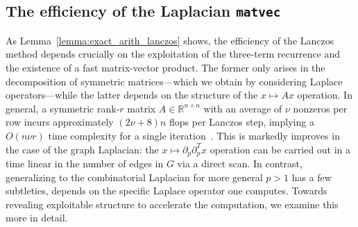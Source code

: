 \documentclass[12pt]{article}
\numberwithin{equation}{section}
\newcommand{\+}{%
	\raisebox{0.18ex}{\scaleobj{0.55}{+}}
}
\theoremstyle{definition}
\begin{document}
\subsection{The efficiency of the Laplacian \texttt{matvec}}\label{sec:comb_lap}
As Lemma~\ref{lemma:exact_arith_lanczos} shows, the efficiency of the Lanczos method depends crucially on the exploitation of the three-term recurrence and the existence of a fast matrix-vector product. 
The former only arises in the decomposition of symmetric matrices---which we obtain by considering Laplace operators---while the latter depends on the structure of the $x \mapsto A x$ operation. 
In general, a symmetric rank-$r$ matrix $A \in \mathbb{R}^{n \times n}$ with an average of $\nu$ nonzeros per row incurs approximately $(2\nu + 8)n$ flops per Lanczos step, implying a $O(n\nu r)$ time complexity for a single iteration~\cite{golub2013matrix}. 
This is markedly improves in the case of the graph Laplacian: the $x \mapsto \partial_p \partial_p^T x$ operation can be carried out in a time linear in the number of edges in $G$ via a direct scan. 
In contrast, generalizing to the combinatorial Laplacian for more general $p > 1$ has a few subtleties, depends on the specific Laplace operator one computes.
Towards revealing exploitable structure to accelerate the computation, we examine this more in detail.
\end{document}
